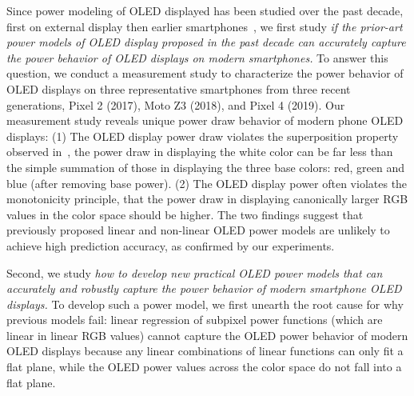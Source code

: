 Since power modeling of OLED displayed has been studied
over the past decade, first on external display then
earlier smartphones~\cite{dong2009current,kim2013runtime,park2015accurate},
we first study {\em if the prior-art power models of OLED display proposed
  in the past decade can accurately capture the power behavior of OLED
  displays on modern smartphones.}  To answer this question, we
conduct a measurement study to characterize the power behavior of OLED
displays on three representative smartphones from 
three recent generations, Pixel 2 (2017), Moto Z3 (2018), and Pixel 4 (2019).
%
Our measurement study reveals
unique power draw behavior of modern phone OLED displays: (1) The OLED
display power draw violates the superposition property observed
in~\cite{dong2009current}, \eg the power draw in displaying
the white color can be far less than the simple summation of those in
displaying the three base colors: red, green and blue (after removing
base power).  (2) The OLED
display power often violates the  monotonicity principle, that
the power draw in displaying canonically larger RGB values in the color
space should be higher.
The two findings suggest that previously proposed
linear and non-linear OLED power models are unlikely to achieve high
prediction accuracy, as confirmed by our experiments.

Second, we study {\em how to develop new practical OLED power models that
  can accurately and robustly capture the power behavior of modern smartphone OLED
  displays.}  To develop such a power model,
we first unearth the root cause for why previous models fail:
linear regression of subpixel power functions (which are linear in linear RGB
values)
cannot capture the OLED power behavior of modern OLED displays
because any linear combinations of linear functions 
can only fit a flat plane, while the OLED power
values across the color space do not fall into a flat plane.

